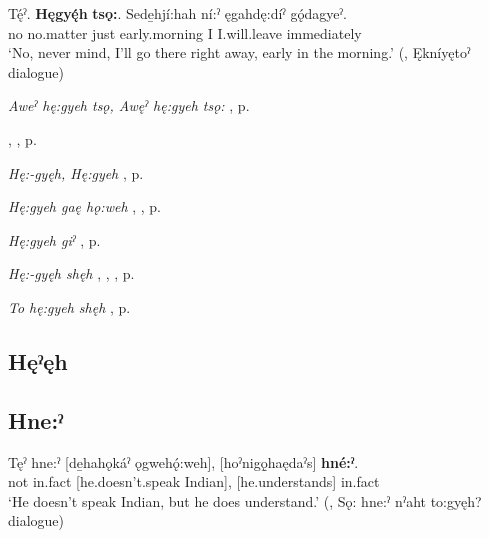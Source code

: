 \ea
\label{ex:hpar37}
\gll Tę́ˀ. \textbf{Hęgyę́h} \textbf{tsǫ:}. Sede̱hjí:hah ní:ˀ ęgahdę:díˀ gǫ́dagyeˀ.\\
no no.matter just early.morning I I.will.leave immediately\\
\glt ‘No, never mind, I’ll go there right away, early in the morning.’ (\cite[494]{mithun_watewayestanih_1984}, Ękníyętoˀ dialogue)
\z


\begin{CayugaRelated}
\item \textit{Aweˀ hę:gyeh tsǫ, Awęˀ hę:gyeh tsǫ:} , p. \pageref{p:[aweˀ hę:gyeh tsǫ:]}\\
\item {} , , p. \pageref{p:[-gyęh]}\\
\item \textit{Hę:-gyęh, Hę:gyeh} , p. \pageref{p:[hę:-gyęh]}\\
\item \textit{Hę:gyeh gaę hǫ:weh} , , p. \pageref{p:[hę:-gyeh gaę hǫ:weh]}\\
\item \textit{Hę:gyeh giˀ} , p. \pageref{p:[hę:-gyeh giˀ]}\\
\item \textit{Hę:-gyęh shęh} , , , p. \pageref{p:[hę:-gyęh shęh]}\\
\item \textit{To hę:gyeh shęh} , p. \pageref{p:[to hę:gyeh shęh]}
\end{CayugaRelated}


\subsection*{\textbf{Hęˀęh} } \label{p:[hęˀęh]}

\subsection*{\textbf{Hne:ˀ} } \label{p:[hne:ˀ] ‘but’}

\ea
\label{ex:hpar38}
\gll Tęˀ hne:ˀ [de̱hahǫkáˀ ǫgwehǫ́:weh], [hoˀnigǫ̱haędaˀs] \textbf{hné:ˀ}.\\
not in.fact [he.doesn’t.speak Indian], [he.understands] in.fact\\
\glt ‘He doesn’t speak Indian, but he does understand.’ (\cite[61]{mithun_watewayestanih_1984}, Sǫ: hne:ˀ nˀaht to:gyęh? dialogue)
\z



